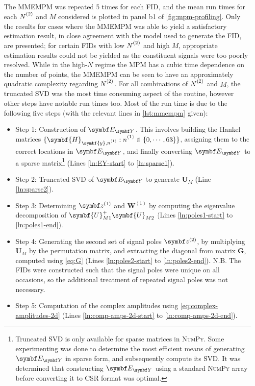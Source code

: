 The \ac{MMEMPM} was repeated 5 times for each \ac{FID}, and the mean run
times for each $\Ntwo$ and $M$ considered is plotted in panel b1 of
\cref{fig:mpm-profiling}.
Only the results for cases where the \ac{MMEMPM} was able to yield a
satisfactory estimation result, in close agreement with the model used to
generate the \ac{FID}, are presented; for certain \acp{FID} with low
$\Ntwo$ and high $M$, appropriate estimation results could not be yielded as
the constituent signals were too poorly resolved.
While in the high-$N$ regime the \ac{MPM} has a cubic time dependence
on the number of points, the \ac{MMEMPM} can be seen to have an approximately
quadratic complexity regarding $\Ntwo$.
For all combinations of $\Ntwo$ and $M$,
the truncated \ac{SVD} was the most time consuming aspect of the routine,
however other steps have notable run times too. Most of the run time is due to
the following five steps (with the relevant lines in \cref{lst:mmempm} given):
\begin{itemize}
    \item Step 1: Construction of $\EY$. This involves building the Hankel matrices
        $\lbrace \symbf{H}_{\symbf{y},\none} : \none \in \lbrace 0, \cdots, 63
        \rbrace \rbrace$, assigning them to the
        correct locations in $\EY$, and finally converting  $\EY$ to a sparse
        matrix\footnote{
            Truncated \ac{SVD} is only available for sparse matrices in
            \textsc{NumPy}\cite{svds}. Some experimenting was done to determine
            the most efficient means of generating $\EY$ in sparse form, and
            subsequently compute its \ac{SVD}.
            It was determined that constructing $\EY$ using a
            standard \textsc{NumPy} array before converting it to
            \ac{CSR} format\cite{csr} was optimal.
        } (Lines \ref{ln:EY-start} to \ref{ln:sparse1}).
    \item Step 2: Truncated \ac{SVD} of $\EY$ to generate $\symbf{U}_M$ (Line \ref{ln:sparse2}).
    \item Step 3: Determining $\bdzone$ and  $\symbf{W}^{(1)}$ by computing the
        eigenvalue decomposition of $\symbf{U}_{M1}^+ \symbf{U}_{M2}^{\vphantom{+}}$ (Lines
        \ref{ln:poles1-start} to \ref{ln:poles1-end}).
    \item Step 4: Generating the second set of signal poles $\bdztwo$, by
        multiplying $\symbf{U}_M$ by the permutation matrix, and extracting
        the diagonal from matrix $\symbf{G}$, computed using \cref{eq:G} (Lines
        \ref{ln:poles2-start} to \ref{ln:poles2-end}). N.B. The \acp{FID} were
        constructed such that the signal poles were unique on all occasions, so
        the additional treatment of repeated signal poles was not necessary.
    \item Step 5: Computation of the complex amplitudes using
        \cref{eq:complex-amplitudes-2d} (Lines \ref{ln:comp-amps-2d-start} to
        \ref{ln:comp-amps-2d-end}).
\end{itemize}
